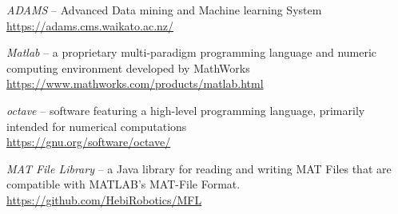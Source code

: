 
\begin{thebibliography}{999}

		\textit{ADAMS} -- Advanced Data mining and Machine learning System \\
		\url{https://adams.cms.waikato.ac.nz/}{}
		
		\textit{Matlab} -- a proprietary multi-paradigm programming language 
                and numeric computing environment developed by MathWorks \\
		\url{https://www.mathworks.com/products/matlab.html}{}
		
		\textit{octave} -- software featuring a high-level programming 
                language, primarily intended for numerical computations \\
		\url{https://gnu.org/software/octave/}{}

		\textit{MAT File Library} -- a Java library for reading and
		writing MAT Files that are compatible with MATLAB’s MAT-File Format. \\
		\url{https://github.com/HebiRobotics/MFL}{}


\end{thebibliography}
